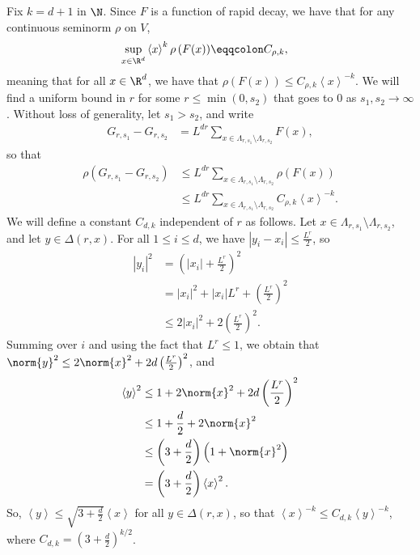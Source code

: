 \documentclass[10pt]{mypackage}
\renewcommand{\eqcolon}{\eqqcolon}
\begin{document}
\begin{solution}
  Fix $k = d+1$ in $\N$. Since $F$ is a function of rapid decay, we have that for any continuous seminorm $\rho$ on $V$, 
  \begin{align*}
    \sup_{x\in \R^d} \left\langle x \right\rangle^{k}\rho\left( F(x) \right) &\eqcolon C_{\rho,k},
  \end{align*}
  meaning that for all $x\in \R^d$, we have that $\rho\left( F(x) \right) \leq C_{\rho,k}\left\langle x \right\rangle^{-k}$. We will find a uniform bound in $r$ for some $r \leq \min\left( 0,s_2 \right)$ that goes to $0$ as $s_1,s_2\to \infty$. Without loss of generality, let $s_1 > s_2$, and write
  \begin{align*}
    G_{r,s_1} - G_{r,s_2} &= L^{dr}\sum_{x\in \Lambda_{r,s_1}\setminus \Lambda_{r,s_2}}F(x),
  \end{align*}
  so that
  \begin{align*}
    \rho\left( G_{r,s_1} - G_{r,s_2} \right) &\leq L^{dr}\sum_{x\in \Lambda_{r,s_1}\setminus \Lambda_{r,s_2}}\rho\left( F(x) \right)\\
                                             &\leq L^{dr}\sum_{x\in \Lambda_{r,s_1}\setminus \Lambda_{r,s_2}}C_{\rho,k}\left\langle x \right\rangle^{-k}.
  \end{align*}
  We will define a constant $C_{d,k}$ independent of $r$ as follows. Let $x\in \Lambda_{r,s_1}\setminus \Lambda_{r,s_2}$, and let $y\in \Delta\left( r,x \right)$. For all $1\leq i \leq d$, we have $\left\vert y_i-x_i \right\vert \leq \frac{L^r}{2}$, so
  \begin{align*}
    \left\vert y_i \right\vert^2 &= \left( \left\vert x_i \right\vert + \frac{L^r}{2} \right)^2\\
                                 &= \left\vert x_i \right\vert^2 + \left\vert x_i \right\vert L^r + \left( \frac{L^r}{2} \right)^2\\
                                 &\leq 2\left\vert x_i \right\vert^2 + 2\left( \frac{L^r}{2} \right)^2.
  \end{align*}
  Summing over $i$ and using the fact that $L^r\leq 1$, we obtain that $\norm{y}^2 \leq 2\norm{x}^2 + 2d\left( \frac{L^r}{2} \right)^2$, and
  \begin{align*}
    \left\langle y \right\rangle^2 &\leq 1 + 2\norm{x}^2 + 2d\left( \frac{L^r}{2} \right)^2\\
                                   &\leq 1 + \frac{d}{2} + 2\norm{x}^2\\
                                   &\leq \left( 3 + \frac{d}{2} \right)\left( 1 + \norm{x}^2 \right)\\
                                   &= \left( 3 + \frac{d}{2} \right)\left\langle x \right\rangle^2.
  \end{align*}
  So, $\left\langle y \right\rangle \leq \sqrt{3 + \frac{d}{2}}\left\langle x \right\rangle$ for all $y\in \Delta\left( r,x \right)$, so that $\left\langle x \right\rangle^{-k}\leq C_{d,k}\left\langle y \right\rangle^{-k}$, where $C_{d,k} = \left( 3 + \frac{d}{2} \right)^{k/2}$.


\end{solution}
\end{document}
